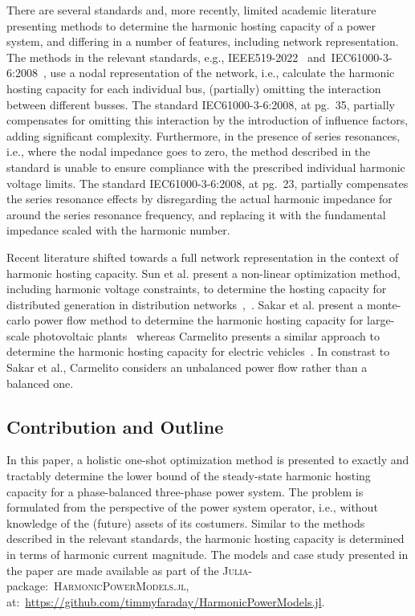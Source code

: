There are several standards and, more recently, limited academic literature presenting methods to determine the harmonic hosting capacity of a power system, and differing in a number of features, including network representation. The methods in the relevant standards, e.g., IEEE519-2022~\cite{noauthor_ieee519_2022} and~IEC61000-3-6:2008~\cite{noauthor_iec61000-3-6_2008}, use a nodal representation of the network, i.e., calculate the harmonic hosting capacity for each individual bus, (partially) omitting the interaction between different busses. The standard IEC61000-3-6:2008, at pg.~35, partially compensates for omitting this interaction by the introduction of influence factors, adding significant complexity. Furthermore, in the presence of series resonances, i.e., where the nodal impedance goes to zero, the method described in the standard is unable to ensure compliance with the prescribed individual harmonic voltage limits. The standard IEC61000-3-6:2008, at pg.~23, partially compensates the series resonance effects by disregarding the actual harmonic impedance for around the series resonance frequency, and replacing it with the fundamental impedance scaled with the harmonic number. 

Recent literature shifted towards a full network representation in the context of harmonic hosting capacity. Sun et al. present a non-linear optimization method, including harmonic voltage constraints, to determine the hosting capacity for distributed generation in distribution networks~\cite{sun_distribution_2012},~\cite{sun_incorporating_2012}. Sakar et al. present a monte-carlo power flow method to determine the harmonic hosting capacity for large-scale photovoltaic plants~\cite{sakar_integration_2018} whereas Carmelito presents a similar approach to determine the harmonic hosting capacity for electric vehicles~\cite{carmelito_hosting_2023}. In constrast to Sakar et al., Carmelito considers an unbalanced power flow rather than a balanced one.

\subsection{Contribution and Outline}
\label{sec:contribution_and_outline}

In this paper, a holistic one-shot optimization method is presented to exactly and tractably determine the lower bound of the steady-state harmonic hosting capacity for a phase-balanced three-phase power system. The problem is formulated from the perspective of the power system operator, i.e., without knowledge of the (future) assets of its costumers. Similar to the methods described in the relevant standards, the harmonic hosting capacity is determined in terms of harmonic current magnitude. The models and case study presented in the paper are made available as part of the \textsc{Julia}-package:~\textsc{HarmonicPowerModels.jl}, at:~\href{https://github.com/timmyfaraday/HarmonicPowerModels.jl}{https://github.com/timmyfaraday/HarmonicPowerModels.jl}.

